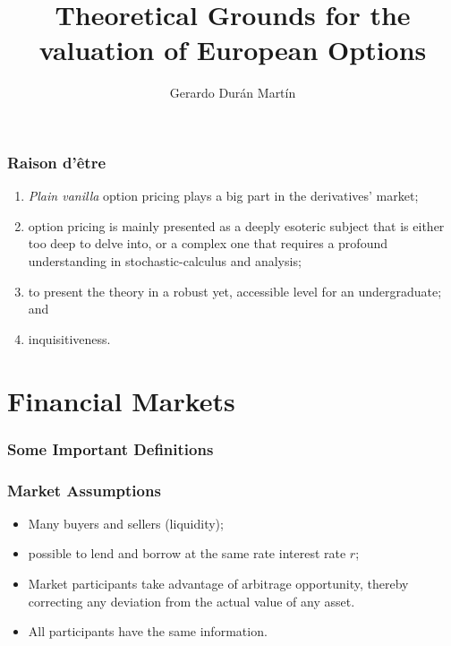 \documentclass{beamer}
\title{Theoretical Grounds for the valuation of European Options}
\author{Gerardo Dur\'an Mart\'in}
\institute{Universidad Marista}
\begin{document}
\frame{\titlepage}

\begin{frame}
	\frametitle{Raison d'\^etre}
	\begin{enumerate}
		\item<1-> \textit{Plain vanilla} option pricing plays a big part in the derivatives' market;
		\item<2-> option pricing is mainly presented as a deeply esoteric subject that is either too deep to delve into, or a complex one that requires a profound understanding in stochastic-calculus and analysis;
		\item<3-> to present the theory in a robust yet, accessible level for an undergraduate; and
		\item<4-> inquisitiveness.
	\end{enumerate}
\end{frame}

\section{Financial Markets}

\begin{frame}
\frametitle{Some Important Definitions}



\end{frame}


\begin{frame}
\frametitle{Market Assumptions}
\begin{itemize}
	\item Many buyers and sellers (liquidity);
	\item possible to lend and borrow at the same rate interest rate $r$;
	\item Market participants take advantage of arbitrage opportunity, thereby correcting any deviation from the actual value of any asset.
	\item All participants have the same information.
\end{itemize}
\end{frame}
\end{document}
